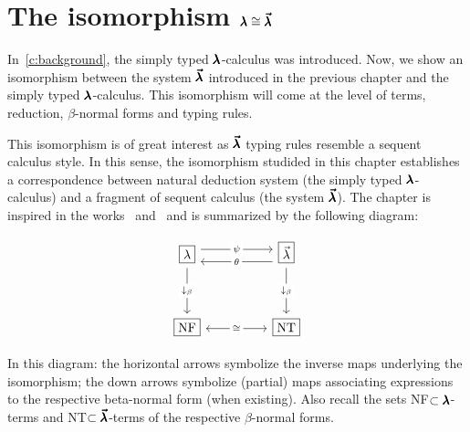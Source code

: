 \chapter{The isomorphism $\pmb{\lambda} \cong \pmb{\vec \lambda}$}
\label{c:isomorphism}

In~\cref{c:background}, the simply typed $\pmb{\lambda}$-calculus was introduced.
Now, we show an isomorphism between the system $\pmb{\vec \lambda}$ introduced in the previous chapter and the simply typed $\pmb{\lambda}$-calculus.
This isomorphism will come at the level of terms, reduction, $\beta$-normal forms and typing rules.

This isomorphism is of great interest as $\pmb{\vec \lambda}$ typing rules resemble a sequent calculus style.
In this sense, the isomorphism studided in this chapter establishes a correspondence between natural deduction system (the simply typed $\pmb{\lambda}$-calculus) and a fragment of sequent calculus (the system $\pmb{\vec \lambda}$).
The chapter is inspired in the works~\cite{LuisDychkoff} and~\cite[Chapter~4]{JCES2002} and is summarized by the following diagram:

\[\begin{tikzcd}
    {\boxed\lambda} && {\boxed{\vec \lambda}} \\
    \\
    {\boxed{\text{NF}}} && {\boxed{\text{NT}}}
    \arrow["\psi"{description}, shift left=2, from=1-1, to=1-3]
    \arrow["{\downarrow_\beta}"{description}, from=1-1, to=3-1]
    \arrow["\theta"{description}, shift left=2, from=1-3, to=1-1]
    \arrow["{\downarrow_{\beta}}"{description}, from=1-3, to=3-3]
    \arrow["\cong"{description}, <->, from=3-1, to=3-3]
  \end{tikzcd}\]

In this diagram: the horizontal arrows symbolize the inverse maps underlying the isomorphism; the down arrows symbolize (partial) maps associating expressions to the respective beta-normal form (when existing).
Also recall the sets NF$\subset \pmb{\lambda}$-terms and NT$\subset \pmb{\vec \lambda}$-terms of the respective $\beta$-normal forms.

